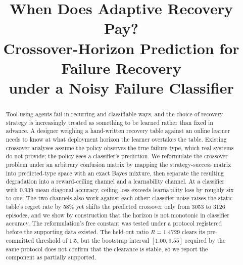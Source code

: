 \documentclass[conference]{IEEEtran}
\begin{document}
\title{When Does Adaptive Recovery Pay?\\
Crossover-Horizon Prediction for Failure Recovery\\
under a Noisy Failure Classifier}

\author{
\and
{}
}

\maketitle

\begin{abstract}
Tool-using agents fail in recurring and classifiable ways, and the choice of
recovery strategy is increasingly treated as something to be learned rather
than fixed in advance. A designer weighing a hand-written recovery table
against an online learner needs to know at what deployment horizon the learner
overtakes the table. Existing crossover analyses assume the policy observes the
true failure type, which real systems do not provide; the policy sees a
classifier's prediction. We reformulate the crossover problem under an
arbitrary confusion matrix by mapping the strategy-success matrix into
predicted-type space with an exact Bayes mixture, then separate the resulting
degradation into a reward-ceiling channel and a learnability channel. At a
classifier with 0.939 mean diagonal accuracy, ceiling loss exceeds learnability
loss by roughly six to one. The two channels also work against each other:
classifier noise raises the static table's regret rate by 58\% yet shifts the
predicted crossover only from 3053 to 3126 episodes, and we show by
construction that the horizon is not monotonic in classifier accuracy. The
reformulation's free constant was tested under a protocol registered before the
supporting data existed. The held-out ratio $R = 1.4729$ clears its
pre-committed threshold of 1.5, but the bootstrap interval $[1.00, 9.55]$
required by the same protocol does not confirm that the clearance is stable, so
we report the component as partially supported.
\end{abstract}
\end{document}
